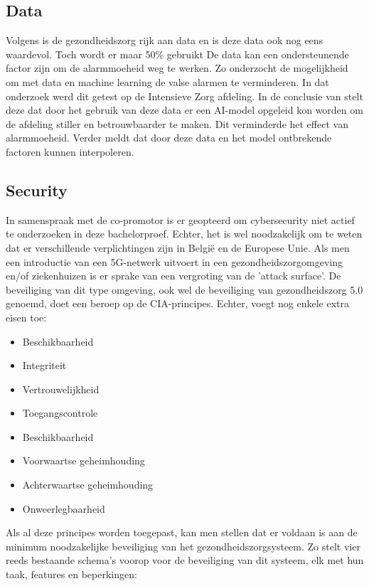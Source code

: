 \subsection{Data}

Volgens \textcite{Niekerk2020} is de gezondheidszorg rijk aan data en is deze data ook nog eens waardevol. Toch wordt er maar 50\% gebruikt 
De data kan een ondersteunende factor zijn om de alarmmoeheid weg te werken. Zo onderzocht \textcite{Hever2019} de mogelijkheid om met data en machine learning de valse alarmen te verminderen. In dat onderzoek werd dit getest op de Intensieve Zorg afdeling. In de conclusie van \textcite{Hever2019} stelt deze dat door het gebruik van deze data er een AI-model opgeleid kon worden om de afdeling stiller en betrouwbaarder te maken. Dit verminderde het effect van alarmmoeheid. Verder meldt \textcite{Hever2019} dat door deze data en het model  ontbrekende factoren kunnen interpoleren.


\subsection{Security}
In samenspraak met de co-promotor is er geopteerd om cybersecurity niet actief te onderzoeken in deze bachelorproef. Echter, het is wel noodzakelijk om te weten dat er verschillende verplichtingen zijn in België en de Europese Unie. Als men een introductie van een 5G-netwerk uitvoert in een gezondheidszorgomgeving en/of ziekenhuizen is er sprake van een vergroting van de 'attack surface'. De beveiliging van dit type omgeving, ook wel de beveiliging van gezondheidszorg 5.0 genoemd, doet een beroep op de CIA-principes. Echter, \textcite{Wazid2022} voegt nog enkele extra eisen toe:

\begin{itemize}
  \item Beschikbaarheid
  \item Integriteit
  \item Vertrouwelijkheid
  \item Toegangscontrole
  \item Beschikbaarheid
  \item Voorwaartse geheimhouding
  \item Achterwaartse geheimhouding
  \item Onweerlegbaarheid
\end{itemize}

Als al deze principes worden toegepast, kan men stellen dat er voldaan is aan de minimum noodzakelijke beveiliging van het gezondheidszorgsysteem. Zo stelt \textcite{Wazid2022} vier reeds bestaande schema's voorop voor de beveiliging van dit systeem, elk met hun taak, features en beperkingen:

